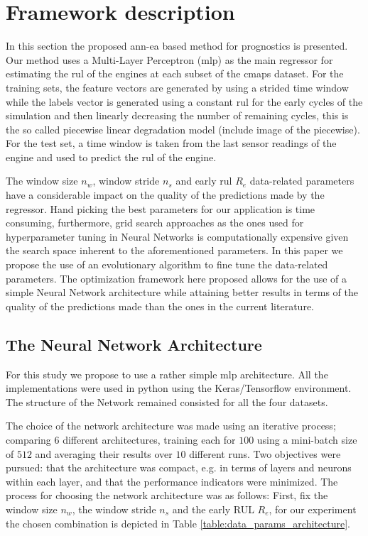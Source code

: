 \section{Framework description}
\label{sec:method}

In this section the proposed \gls{ann}-\gls{ea} based method for prognostics is presented. Our method uses a Multi-Layer Perceptron (\gls{mlp}) as the main regressor for estimating the \gls{rul} of the engines at each subset of the \gls{cmaps} dataset. For the training sets, the feature vectors are generated by using a strided time window while the labels vector is generated using a constant \gls{rul} for the early cycles of the simulation and then linearly decreasing the number of remaining cycles, this is the so called piecewise linear degradation model \cite{Ramasso2014} (include image of the piecewise). For the test set, a time window is taken from the last sensor readings of the engine and used to predict the \gls{rul} of the engine.

The window size $n_w$, window stride $n_s$ and early \gls{rul} $R_e$ data-related parameters have a considerable impact on the quality of the predictions made by the regressor. Hand picking the best parameters for our application is time consuming, furthermore, grid search approaches as the ones used for hyperparameter tuning in Neural Networks is computationally expensive given the search space inherent to the aforementioned parameters. In this paper we propose the use of an evolutionary algorithm to fine tune the data-related parameters. The optimization framework here proposed allows for the use of a simple Neural Network architecture while attaining better results in terms of the quality of the predictions made than the ones in the current literature.

\subsection{The Neural Network Architecture}

For this study we propose to use a rather simple \gls{mlp} architecture. All the implementations were used in python using the Keras/Tensorflow environment. The structure of the Network remained consisted for all the four datasets.

The choice of the network architecture was made using an iterative process; comparing 6 different architectures, training each for $100$ using a mini-batch size of $512$ and averaging their results over $10$ different runs. Two objectives were pursued: that the architecture was compact, e.g. in terms of layers and neurons within each layer, and that the performance indicators were minimized. The process for choosing the network architecture was as follows: First, fix the window size $n_w$, the window stride $n_s$ and the early RUL $R_e$, for our experiment the chosen combination is depicted in Table \ref{table:data_params_architecture}.

